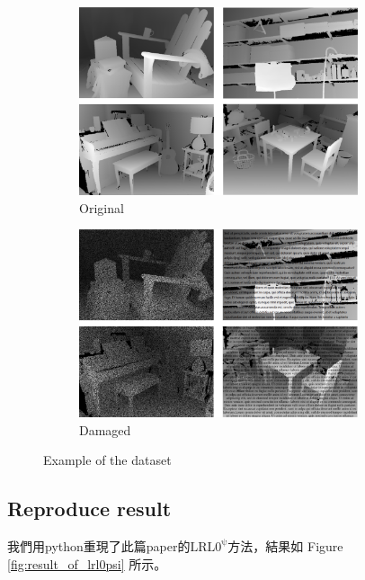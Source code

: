 \documentclass{article}
\begin{document}
\begin{CJK*}{UTF8}{bkai}
\begin{figure}[h]
    \centering
    \begin{subfigure}{0.45\textwidth}
        \centering
        \includegraphics[width=0.9\textwidth]{imgs/dataset1.png}
        \caption{Original}
    \end{subfigure}
    \begin{subfigure}{0.45\textwidth}
        \centering
        \includegraphics[width=0.9\textwidth]{imgs/dataset2.png}
        \caption{Damaged}
    \end{subfigure}
    \caption{Example of the dataset}
    \label{fig:example_of_dataset}
\end{figure}

\subsection{Reproduce result}
我們用python重現了此篇paper的$\mathrm{LRL0^{\psi}}$方法，結果如 Figure \ref{fig:result_of_lrl0psi} 所示。


\end{CJK*}
\end{document}
